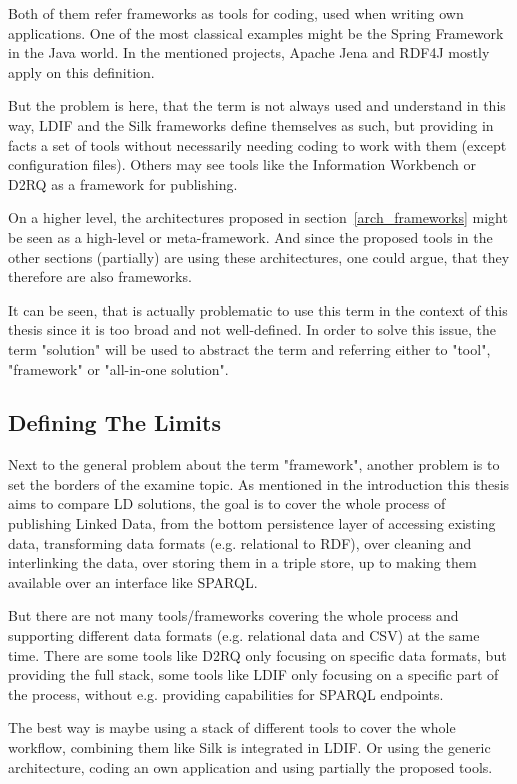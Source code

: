 Both of them refer frameworks as tools for coding, used when writing own 
applications. One of the most classical examples might be the Spring Framework in 
the Java world. In the mentioned projects, Apache Jena and RDF4J mostly apply on 
this definition.

But the problem is here, that the term is not always used and understand in this 
way, LDIF and the Silk frameworks define themselves as such, but providing in 
facts a set of tools without necessarily needing coding to work with them (except 
configuration files). Others may see tools like the Information Workbench or D2RQ 
as a framework for publishing.

On a higher level, the architectures proposed in section~\ref{arch_frameworks} 
might be seen as a high-level or meta-framework. And since the proposed tools in 
the other sections (partially) are using these architectures, one could argue, 
that they therefore are also frameworks.

It can be seen, that is actually problematic to use this term in the context of 
this thesis since it is too broad and not well-defined. In order to solve this 
issue, the term "solution" will be used to abstract the term and referring either 
to "tool", "framework" or "all-in-one solution".

\subsection{Defining The Limits}

Next to the general problem about the term "framework", another problem is to set 
the borders of the examine topic. As mentioned in the introduction this thesis 
aims to compare LD solutions, the goal is to cover the whole process of publishing 
Linked Data, from the bottom persistence layer of accessing existing data, 
transforming data formats (e.g. relational to RDF), over cleaning and interlinking 
the data, over storing them in a triple store, up to making them available over an 
interface like SPARQL.

But there are not many tools/frameworks covering the whole process and supporting 
different data formats (e.g. relational data and CSV) at the same time. There are 
some tools like D2RQ only focusing on specific data formats, but providing the 
full stack, some tools like LDIF only focusing on a specific part of the process, 
without e.g. providing capabilities for SPARQL endpoints.

The best way is maybe using a stack of different tools to cover the whole 
workflow, combining them like Silk is integrated in LDIF. Or using the generic 
architecture, coding an own application and using partially the proposed tools.

